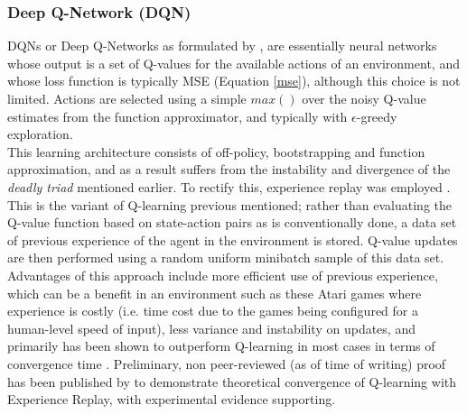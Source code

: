 \documentclass[12pt]{article}
\begin{document}
\subsubsection{Deep Q-Network (DQN)}
DQNs or Deep Q-Networks as formulated by \textcite{Mnih2015,DBLP:journals/corr/MnihKSGAWR13}, are essentially neural networks whose output is a set of Q-values for the available actions of an environment, and whose loss function is typically MSE (Equation \ref{mse}), although this choice is not limited. Actions are selected using a simple $max()$ over the noisy Q-value estimates from the function approximator, and typically with $\epsilon$-greedy exploration. 
\\\newline This learning architecture consists of off-policy, bootstrapping and function approximation, and as a result suffers from the instability and divergence of the \textit{deadly triad} mentioned earlier. To rectify this, experience replay was employed \autocite{Mnih2015}. This is the variant of Q-learning previous mentioned; rather than evaluating the Q-value function based on state-action pairs as is conventionally done, a data set of previous experience of the agent in the environment is stored. Q-value updates are then performed using a random uniform minibatch sample of this data set. Advantages of this approach include more efficient use of previous experience, which can be a benefit in an environment such as these Atari games where experience is costly (i.e. time cost due to the games being configured for a human-level speed of input), less variance and instability on updates, and primarily has been shown to outperform Q-learning in most cases in terms of convergence time \autocite{pieters2016q}. Preliminary, non peer-reviewed (as of time of writing) proof has been published by \textcite{DBLP:journals/corr/abs-2112-04213} to demonstrate theoretical convergence of Q-learning with Experience Replay, with experimental evidence supporting.
\end{document}
